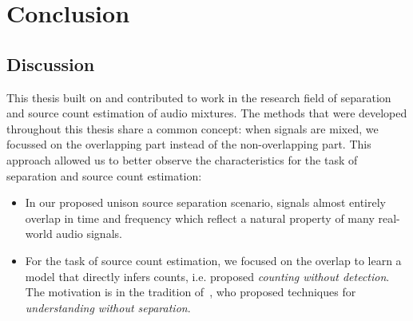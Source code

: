 \chapter{Conclusion}%
\label{cha:conclusion}



\section{Discussion}
This thesis built on and contributed to work in the research field of separation and source count estimation of audio mixtures. The methods that were developed throughout this thesis share a common concept: when signals are mixed, we focussed on the overlapping part instead of the non-overlapping part.
This approach allowed us to better observe the characteristics for the task of separation and source count estimation:

\begin{itemize}
  \item In our proposed unison source separation scenario, signals almost entirely overlap in time and frequency which reflect a natural property of many real-world audio signals.
  \item For the task of source count estimation, we focused on the overlap to learn a model that directly infers counts, i.e. proposed \emph{counting without detection}. The motivation is in the tradition of~\cite{scheirer99}, who proposed techniques for \emph{understanding without separation}.
\end{itemize}

